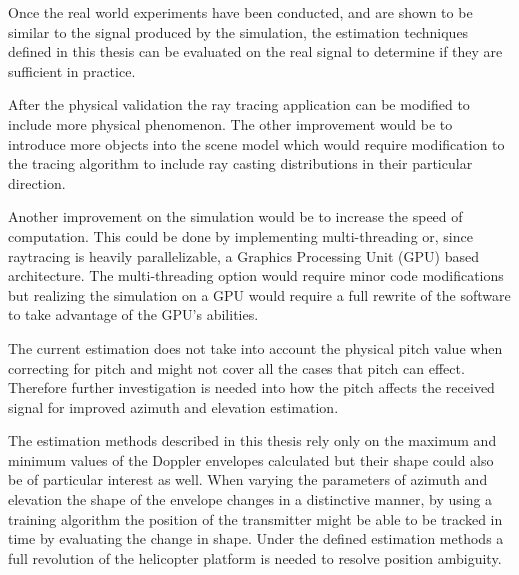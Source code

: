 Once the real world experiments have been conducted, and are shown to be similar to the signal produced by the simulation, the estimation techniques defined in this thesis can be evaluated on the real signal to determine if they are sufficient in practice.

After the physical validation the ray tracing application can be modified to include more physical phenomenon. The other improvement would be to introduce more objects into the scene model which would require modification to the tracing algorithm to include ray casting distributions in their particular direction.

Another improvement on the simulation would be to increase the speed of computation. This could be done by implementing multi-threading or, since raytracing is heavily parallelizable, a Graphics Processing Unit (GPU) based architecture. The multi-threading option would require minor code modifications but realizing the simulation on a GPU would require a full rewrite of the software to take advantage of the GPU's abilities. 

The current estimation does not take into account the physical pitch value when correcting for pitch and might not cover all the cases that pitch can effect. Therefore further investigation is needed into how the pitch affects the received signal for improved azimuth and elevation estimation.

The estimation methods described in this thesis rely only on the maximum and minimum values of the Doppler envelopes calculated but their shape could also be of particular interest as well. When varying the parameters of azimuth and elevation the shape of the envelope changes in a distinctive manner, by using a training algorithm the position of the transmitter might be able to be tracked in time by evaluating the change in shape. Under the defined estimation methods a full revolution of the helicopter platform is needed to resolve position ambiguity.
 

